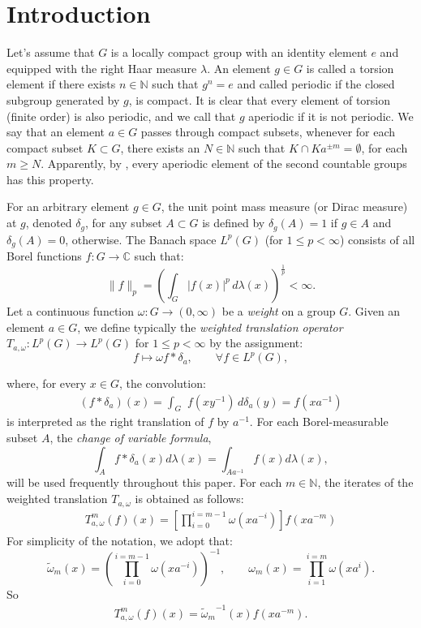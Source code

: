 \documentclass{amsart}
\theoremstyle{definition}\newtheorem{defn}[thm]{Definition}
\theoremstyle{remark}
\numberwithin{equation}{section}
\begin{document}
\section{\textbf{Introduction}}
Let's assume that $ G $ is a locally compact group with an identity
element $ e $ and equipped with the right Haar measure $\lambda$.
 An element $ g \in G $ is called a torsion element if there exists
 $ n \in \mathbb{N} $ such that $ g^n = e $ and called
 periodic if the closed subgroup generated by $g$, is compact. It is clear
 that every element of torsion (finite order) is also periodic, and we
 call that $ g $ aperiodic if it is not periodic.
We say that an element $a\in G$ passes through  compact subsets,
 whenever for each compact subset $K\subset G$,  there exists an $N \in
\mathbb{N}$ such that $K \cap Ka^{\pm m}= \emptyset$, for each  $ m
\geq N $. Apparently, by \cite[Lemma 2.1]{chu},   every  aperiodic
element of the second countable groups has this property.

 For an arbitrary element
 $g \in G $, the unit point mass  measure (or Dirac measure) at $g$, denoted $\delta_g$,   for any
  subset $A \subset G $ is defined by  $ \delta_g(A) = 1 $ if
 $ g \in A $ and $ \delta_g(A) = 0$, otherwise.
 The Banach space $ L^p(G) $ (for $ 1 \leq p < \infty $) consists
of all Borel functions $ f: G \rightarrow \mathbb{C}$ such that:
\[
\|f\|_p = \left( \int_G |f(x)|^p \, d\lambda(x)
\right)^{\frac{1}{p}} < \infty.
\]
Let a continuous function $ \omega: G \to (0, \infty) $ be a
\emph{weight} on a group $ G $. Given an element $ a \in G $, we
define  typically the \emph{weighted translation operator} $
T_{a,\omega}: L^p(G) \to L^p(G) $ for $ 1 \leq p < \infty $ by the
assignment:
 $$ f\mapsto \omega f\ast\delta_a,\qquad\forall f\in L^p(G),$$

where, for every $ x \in G$, the convolution:
\begin{eqnarray*}
(f\ast\delta_a)(x)=\int_G\,\,f(xy^{-1})\,d\delta_a(y)=f(xa^{-1})
\end{eqnarray*}
is interpreted as  the right translation of $f$ by $a^{-1}$. For
each Borel-measurable subset $A$, the \emph{change of variable
formula},  $$\int_{A} f*\delta_a(x)d\lambda(x)=
  \int_{Aa^{-1}} f(x) d\lambda(x),$$ will be used
  frequently throughout this paper. For
each $m\in \mathbb{N}$, the iterates of the weighted translation
 $T_{a,\omega}$ is obtained as follows:
\begin{eqnarray*}
T^m_{a,\omega}(f)(x)=[\prod_{i=0}^{i=m-1}\omega(xa^{-i})]f(xa^{-m})
\end{eqnarray*}
For simplicity of the notation, we adopt that:
 $${\tilde{\omega}_{m}}(x)=(\prod_{i=0}^{i=m-1}\omega(xa^{-i}))^{-1},
 \qquad \omega_{m}(x)=\prod_{i=1}^{i=m}\omega(xa^{i}).$$
 So
\begin{eqnarray*}
T^m_{a,\omega}(f)(x)={\tilde{\omega}_{m}}^{-1}(x)f(xa^{-m}).
\end{eqnarray*}
\end{document}
